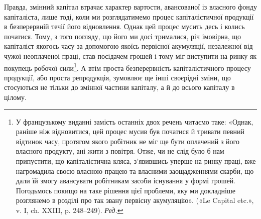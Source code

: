 Правда, змінний капітал втрачає характер вартости, авансованої
із власного фонду капіталіста, лише тоді, коли ми розглядатимемо
процес капіталістичної продукції в безперервній течії
його відновлення. Однак цей процес мусить десь і колись початися.
Тому, з того погляду, що його ми досі трималися, річ
імовірна, що капіталіст якогось часу за допомогою якоїсь первісної
акумуляції, незалежної від чужої неоплаченоі праці,
став посідачем грошей і тому міг виступити на ринку як
покупець робочої сили\footnote*{
У французькому виданні замість останніх двох речень читаємо
таке: «Однак, раніше ніж відновитися, цей процес мусив був початися
й тривати певний відтинок часу, протягом якого робітник не міг ще бути
оплачений з його власного продукту, ані жити з повітря. Отже, чи не слід
було б нам припустити, що капіталістична кляса, з’явившись уперше
на ринку праці, вже нагромадила своєю власною працею та власними
заощадженнями скарби, що дали їй змогу авансувати робітникам засоби
існування у формі грошей. Погодьмось покищо на таке рішення цієї
проблеми, яку ми докладніше розглянемо в розділі про так звану первісну
акумуляцію». («Le Capital etc.», v. I, ch. XXIII, p. 248--249). \emph{Ред.}
}. А втім проста безперервність капіталістичного
процесу продукції, або проста репродукція, зумовлює
ще інші своєрідні зміни, що стосуються не тільки до змінної
частини капіталу, а й до всього капіталу в цілому.


